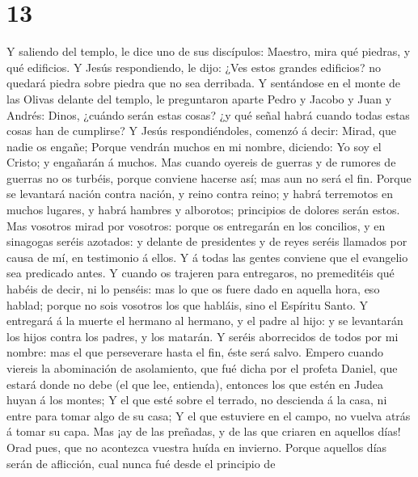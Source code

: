\hypertarget{section-12}{%
\section{13}\label{section-12}}

 Y saliendo del templo, le dice uno de sus discípulos:
Maestro, mira qué piedras, y qué edificios.  Y Jesús
respondiendo, le dijo: ¿Ves estos grandes edificios? no quedará piedra
sobre piedra que no sea derribada.  Y sentándose en el monte
de las Olivas delante del templo, le preguntaron aparte Pedro y Jacobo y
Juan y Andrés:  Dinos, ¿cuándo serán estas cosas? ¿y qué
señal habrá cuando todas estas cosas han de cumplirse?  Y
Jesús respondiéndoles, comenzó á decir: Mirad, que nadie os engañe;
 Porque vendrán muchos en mi nombre, diciendo: Yo soy el
Cristo; y engañarán á muchos.  Mas cuando oyereis de guerras
y de rumores de guerras no os turbéis, porque conviene hacerse así; mas
aun no será el fin.  Porque se levantará nación contra
nación, y reino contra reino; y habrá terremotos en muchos lugares, y
habrá hambres y alborotos; principios de dolores serán estos.
 Mas vosotros mirad por vosotros: porque os entregarán en
los concilios, y en sinagogas seréis azotados: y delante de presidentes
y de reyes seréis llamados por causa de mí, en testimonio á ellos.
 Y á todas las gentes conviene que el evangelio sea
predicado antes.  Y cuando os trajeren para entregaros, no
premeditéis qué habéis de decir, ni lo penséis: mas lo que os fuere dado
en aquella hora, eso hablad; porque no sois vosotros los que habláis,
sino el Espíritu Santo.  Y entregará á la muerte el hermano
al hermano, y el padre al hijo: y se levantarán los hijos contra los
padres, y los matarán.  Y seréis aborrecidos de todos por
mi nombre: mas el que perseverare hasta el fin, éste será salvo.
 Empero cuando viereis la abominación de asolamiento, que
fué dicha por el profeta Daniel, que estará donde no debe (el que lee,
entienda), entonces los que estén en Judea huyan á los montes;
 Y el que esté sobre el terrado, no descienda á la casa, ni
entre para tomar algo de su casa;  Y el que estuviere en el
campo, no vuelva atrás á tomar su capa.  Mas ¡ay de las
preñadas, y de las que criaren en aquellos días!  Orad
pues, que no acontezca vuestra huída en invierno.  Porque
aquellos días serán de aflicción, cual nunca fué desde el principio de
